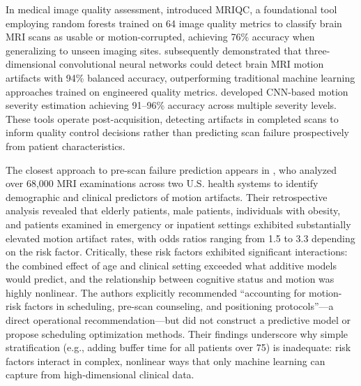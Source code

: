 \documentclass[msom,blindrev]{informs3}
\begin{document}
In medical image quality assessment, \citet{esteban2017mriqc} introduced MRIQC, a foundational tool employing random forests trained on 64 image quality metrics to classify brain MRI scans as usable or motion-corrupted, achieving 76\% accuracy when generalizing to unseen imaging sites. \citet{vakli2023automatic} subsequently demonstrated that three-dimensional convolutional neural networks could detect brain MRI motion artifacts with 94\% balanced accuracy, outperforming traditional machine learning approaches trained on engineered quality metrics. \citet{beljaards2024motion} developed CNN-based motion severity estimation achieving 91--96\% accuracy across multiple severity levels. These tools operate post-acquisition, detecting artifacts in completed scans to inform quality control decisions rather than predicting scan failure prospectively from patient characteristics.

The closest approach to pre-scan failure prediction appears in \citet{porembka2025disparities}, who analyzed over 68,000 MRI examinations across two U.S. health systems to identify demographic and clinical predictors of motion artifacts. Their retrospective analysis revealed that elderly patients, male patients, individuals with obesity, and patients examined in emergency or inpatient settings exhibited substantially elevated motion artifact rates, with odds ratios ranging from 1.5 to 3.3 depending on the risk factor. Critically, these risk factors exhibited significant interactions: the combined effect of age and clinical setting exceeded what additive models would predict, and the relationship between cognitive status and motion was highly nonlinear. The authors explicitly recommended ``accounting for motion-risk factors in scheduling, pre-scan counseling, and positioning protocols''---a direct operational recommendation---but did not construct a predictive model or propose scheduling optimization methods. Their findings underscore why simple stratification (e.g., adding buffer time for all patients over 75) is inadequate: risk factors interact in complex, nonlinear ways that only machine learning can capture from high-dimensional clinical data.
\end{document}
